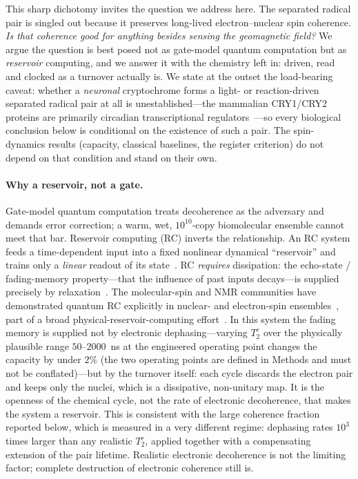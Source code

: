 \documentclass[aps,prx,reprint,superscriptaddress,nofootinbib,floatfix]{revtex4-2}
\begin{document}
This sharp dichotomy invites the question we address here. The separated radical
pair is singled out because it preserves long-lived electron--nuclear spin
coherence. \emph{Is that coherence good for anything besides sensing the
geomagnetic field?} We argue the question is best posed not as gate-model quantum
computation but as \emph{reservoir} computing, and we answer it with the chemistry
left in: driven, read and clocked as a turnover actually is. We state at the outset
the load-bearing caveat: whether a \emph{neuronal} cryptochrome forms a
light- or reaction-driven separated radical pair at all is unestablished---the
mammalian CRY1/CRY2 proteins are primarily circadian transcriptional
regulators~\cite{Partch2014}---so every biological conclusion below is conditional
on the existence of such a pair. The spin-dynamics results (capacity, classical
baselines, the register criterion) do not depend on that condition and stand on
their own.

\paragraph*{Why a reservoir, not a gate.}
Gate-model quantum computation treats decoherence as the adversary and demands
error correction; a warm, wet, $10^{10}$-copy biomolecular ensemble cannot meet
that bar. Reservoir computing (RC) inverts the relationship. An RC system feeds a
time-dependent input into a fixed nonlinear dynamical ``reservoir'' and trains only
a \emph{linear} readout of its state~\cite{Maass2002,Jaeger2004}. RC \emph{requires}
dissipation: the echo-state / fading-memory property---that the influence of past
inputs decays---is supplied precisely by relaxation~\cite{Fujii2017,Nakajima2019}.
The molecular-spin and NMR communities have demonstrated quantum RC explicitly in
nuclear- and electron-spin ensembles~\cite{Fujii2017,Nakajima2019,Martinez2021},
part of a broad physical-reservoir-computing effort~\cite{Tanaka2019}.
In this system the fading memory is supplied not by electronic dephasing---varying
$T_2^e$ over the physically plausible range $50$--$2000$~ns at the engineered
operating point changes the capacity by under $2\%$ (the two operating points are
defined in Methods and must not be conflated)---but by the turnover itself: each cycle discards the electron pair and
keeps only the nuclei, which is a dissipative, non-unitary map. It is the openness
of the chemical cycle, not the rate of electronic decoherence, that makes the
system a reservoir. This is consistent with the large coherence fraction reported
below, which is measured in a very different regime: dephasing rates $10^{3}$ times
larger than any realistic $T_2^e$, applied together with a compensating extension
of the pair lifetime. Realistic electronic decoherence is not the limiting factor;
complete destruction of electronic coherence still is.
\end{document}
